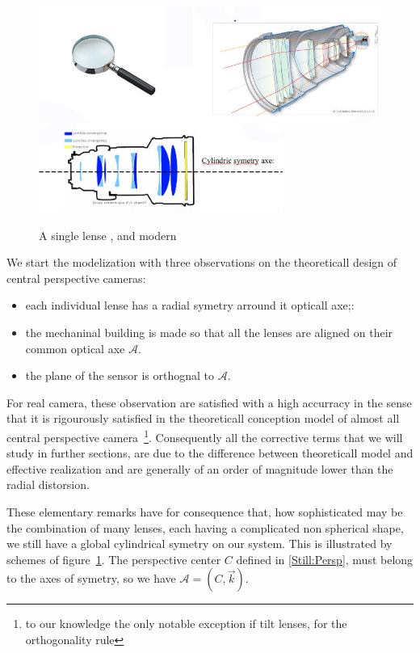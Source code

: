 \begin{figure}
\centering
	\includegraphics[width=12cm]{Methods/Images/Lenses.jpg} \\
	\includegraphics[width=8cm]{Methods/Images/LensesCyl.jpg}
	\caption{A single lense , and modern }
	\label{fig:Lenses}
\end{figure}

We start the modelization with three observations on the theoreticall design of central perspective cameras:

\begin{itemize}
    \item  each individual lense has a radial symetry arround it opticall axe;:
    \item  the mechaninal building is made so that all the lenses are aligned on
	    their common optical axe $\mathcal{A}$.
    \item  the plane of the sensor is orthognal to $\mathcal{A}$.
\end{itemize}

For real camera, these observation are satisfied with a high accurracy in the sense that it is
rigourously satisfied in the theoreticall conception model of almost all central perspective
camera~\footnote{to our knowledge the only notable exception if tilt lenses, for the orthogonality rule}.
Consequently all the corrective terms that we will study in further sections,
are due to the difference between theoreticall model and effective realization and are
generally of an order of magnitude lower than the radial distorsion.

These elementary remarks have for consequence that, how sophisticated may be the combination
of many lenses, each having a complicated non spherical shape, we still have a global cylindrical
symetry on our system. This is illustrated by schemes of figure~\ref{fig:Lenses}.
The perspective center $C$ defined in \ref{Still:Persp}, must belong to the axes of symetry,
so we have $\mathcal{A}=(C,\vec{k})$. 

